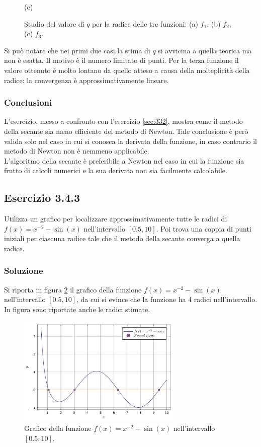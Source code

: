 \documentclass[letterpaper, 12pt]{article}
\numberwithin{equation}{section}    %
\begin{document}
\begin{figure}[!ht]
\begin{minipage}[b]{0.32\textwidth}
        \caption*{(c)}
    \end{minipage}
    \caption{Studio del valore di $q$ per la radice delle tre funzioni: (a) $f_1$, (b) $f_2$, (c) $f_3$.}
    \label{fig:es3_4_2_1}
\end{figure}

Si può notare che nei primi due casi la stima di $q$ si avvicina a quella teorica ma non è esatta. Il motivo
è il numero limitato di punti. Per la terza funzione il valore ottenuto è molto lontano da quello atteso a causa 
della molteplicità della radice: la convergenza è approssimativamente lineare.

\subsubsection{Conclusioni}
L'esercizio, messo a confronto con l'esercizio \ref{sec:332}, mostra come il metodo della secante sia 
meno efficiente del metodo di Newton. Tale conclusione è però valida solo nel caso in cui si conosca
la derivata della funzione, in caso contrario il metodo di Newton non è nemmeno applicabile. \\
L'algoritmo della secante è preferibile a Newton nel caso in cui la funzione sia frutto di calcoli numerici
e la sua derivata non sia facilmente calcolabile.

\subsection{Esercizio 3.4.3}
Utilizza un grafico per localizzare approssimativamente tutte le radici di $f(x)=x^{-2}-\sin(x)$ 
nell'intervallo $[0.5,10]$. 
Poi trova una coppia di punti iniziali per ciascuna radice tale che il metodo della secante converga 
a quella radice.

\subsubsection{Soluzione}
Si riporta in figura \ref{fig:es3_4_3_1} il grafico della funzione $f(x)=x^{-2}-\sin(x)$ nell'intervallo
$[0.5,10]$, da cui si evince che la funzione ha 4 radici nell'intervallo. In figura sono riportate anche
le radici stimate.
\begin{figure}[!ht]
    \centering
    \includegraphics[width=0.7\textwidth]{3431.pdf}
    \caption{Grafico della funzione $f(x)=x^{-2}-\sin(x)$ nell'intervallo $[0.5,10]$.}
    \label{fig:es3_4_3_1}
\end{figure}
\end{document}

